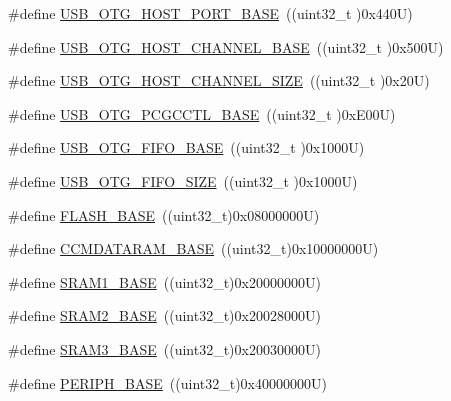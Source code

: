 \begin{DoxyCompactItemize}
\item 
\#define \hyperlink{group___peripheral__memory__map_ga42f433cb79ca69f09972e690fda6737a}{U\+S\+B\+\_\+\+O\+T\+G\+\_\+\+H\+O\+S\+T\+\_\+\+P\+O\+R\+T\+\_\+\+B\+A\+SE}~((uint32\+\_\+t )0x440\+U)
\item 
\#define \hyperlink{group___peripheral__memory__map_ga942c8c5241b80fbcf638fea0fa18bebd}{U\+S\+B\+\_\+\+O\+T\+G\+\_\+\+H\+O\+S\+T\+\_\+\+C\+H\+A\+N\+N\+E\+L\+\_\+\+B\+A\+SE}~((uint32\+\_\+t )0x500\+U)
\item 
\#define \hyperlink{group___peripheral__memory__map_ga266cb1dbb50faf447f9c15d2ee93a522}{U\+S\+B\+\_\+\+O\+T\+G\+\_\+\+H\+O\+S\+T\+\_\+\+C\+H\+A\+N\+N\+E\+L\+\_\+\+S\+I\+ZE}~((uint32\+\_\+t )0x20\+U)
\item 
\#define \hyperlink{group___peripheral__memory__map_gaa9766975aca084c257730879568bc7cf}{U\+S\+B\+\_\+\+O\+T\+G\+\_\+\+P\+C\+G\+C\+C\+T\+L\+\_\+\+B\+A\+SE}~((uint32\+\_\+t )0x\+E00\+U)
\item 
\#define \hyperlink{group___peripheral__memory__map_gace340350802904868673f0e839c4fa04}{U\+S\+B\+\_\+\+O\+T\+G\+\_\+\+F\+I\+F\+O\+\_\+\+B\+A\+SE}~((uint32\+\_\+t )0x1000\+U)
\item 
\#define \hyperlink{group___peripheral__memory__map_ga8781c4b2406c740d9fe540737a6a0188}{U\+S\+B\+\_\+\+O\+T\+G\+\_\+\+F\+I\+F\+O\+\_\+\+S\+I\+ZE}~((uint32\+\_\+t )0x1000\+U)
\item 
\#define \hyperlink{group___peripheral__memory__map_ga23a9099a5f8fc9c6e253c0eecb2be8db}{F\+L\+A\+S\+H\+\_\+\+B\+A\+SE}~((uint32\+\_\+t)0x08000000\+U)
\item 
\#define \hyperlink{group___peripheral__memory__map_gabea1f1810ebeac402164b42ab54bcdf9}{C\+C\+M\+D\+A\+T\+A\+R\+A\+M\+\_\+\+B\+A\+SE}~((uint32\+\_\+t)0x10000000\+U)
\item 
\#define \hyperlink{group___peripheral__memory__map_ga7d0fbfb8894012dbbb96754b95e562cd}{S\+R\+A\+M1\+\_\+\+B\+A\+SE}~((uint32\+\_\+t)0x20000000\+U)
\item 
\#define \hyperlink{group___peripheral__memory__map_gadbb42a3d0a8a90a79d2146e4014241b1}{S\+R\+A\+M2\+\_\+\+B\+A\+SE}~((uint32\+\_\+t)0x20028000\+U)
\item 
\#define \hyperlink{group___peripheral__memory__map_gadb41012a2428a526d7ee5ff0f61d2344}{S\+R\+A\+M3\+\_\+\+B\+A\+SE}~((uint32\+\_\+t)0x20030000\+U)
\item 
\#define \hyperlink{group___peripheral__memory__map_ga9171f49478fa86d932f89e78e73b88b0}{P\+E\+R\+I\+P\+H\+\_\+\+B\+A\+SE}~((uint32\+\_\+t)0x40000000\+U)
\item 

\end{DoxyCompactItemize}
